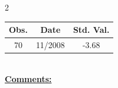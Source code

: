 
\bigskip 
\begin{multicols}{2}{ 
\begin{tabular}{ccc}
\hline  Obs.  &  Date &  Std. Val. \\ 
\hline 
                       70 &       11/2008 &         -3.68 \vspace{-.12in} \\  
 \end{tabular} 
\\ 
 \columnbreak 
 \singlespacing 
 \underline{\textbf{Comments:}} \\ 
 \bigskip       

 } 
\end{multicols} 
